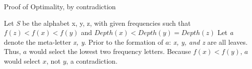 \documentclass{article}
\newcommand{\tab}[1][1]{\noindent \hspace{#1cm} }
\begin{document}
\begin{algorithm} %
\caption{Proof of Optimality, by contradiction} %
\begin{algorithmic} %
    \State Let \textit{S} be the alphabet {x, y, z}, with given frequencies such that
    \State \tab $f(z) < f(x) < f(y)$ and $ Depth(x) < Depth(y) = Depth(z) $
    \State Let \textit{a} denote the meta-letter {\textit{x, y}}.
    \State Prior to the formation of $a$: \textit{x, y, and z} are all leaves.  Thus, $a$ would select the lowest two frequency letters.  Because $f(x) < f(y)$, $a$ would select $x$, not $y$, a contradiction.
\end{algorithmic}
\end{algorithm}
\end{document}
